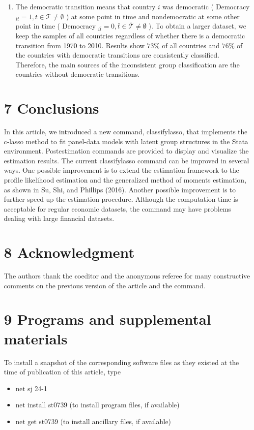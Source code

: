 \documentclass[10pt]{article}
\begin{document}
\begin{enumerate}
  \item The democratic transition means that country $i$ was democratic ( Democracy $_{i t}=1, t \in \mathcal{T} \neq \emptyset$ ) at some point in time and nondemocratic at some other point in time ( Democracy $_{i \bar{t}}=0, \bar{t} \in \overline{\mathcal{T}} \neq \emptyset$ ). To obtain a larger dataset, we keep the samples of all countries regardless of whether there is a democratic transition from 1970 to 2010. Results show $73 \%$ of all countries and $76 \%$ of the countries with democratic transitions are consistently classified. Therefore, the main sources of the inconsistent group classification are the countries without democratic transitions.
\end{enumerate}

\section*{7 Conclusions}
In this article, we introduced a new command, classifylasso, that implements the c-lasso method to fit panel-data models with latent group structures in the Stata environment. Postestimation commands are provided to display and visualize the estimation results. The current classifylasso command can be improved in several ways. One possible improvement is to extend the estimation framework to the profile likelihood estimation and the generalized method of moments estimation, as shown in Su, Shi, and Phillips (2016). Another possible improvement is to further speed up the estimation procedure. Although the computation time is acceptable for regular economic datasets, the command may have problems dealing with large financial datasets.

\section*{8 Acknowledgment}
The authors thank the coeditor and the anonymous referee for many constructive comments on the previous version of the article and the command.

\section*{9 Programs and supplemental materials}
To install a snapshot of the corresponding software files as they existed at the time of publication of this article, type

\begin{itemize}
  \item net sj 24-1
  \item net install st0739 (to install program files, if available)
  \item net get st0739 (to install ancillary files, if available)
\end{itemize}
\end{document}
